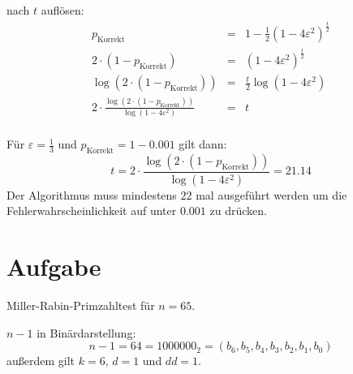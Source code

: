 \documentclass[DIN, pagenumber=false, fontsize=11pt, parskip=half]{scrartcl}
\begin{document}
    nach $t$ auflösen:
    \begin{eqnarray}
        p_\text{Korrekt} &=& 1 - \frac{1}{2} {\left(1 - 4 \varepsilon^2 \right)}^{\frac{t}{2}} \\
        2 \cdot (1 - p_\text{Korrekt}) &=& {\left(1 - 4 \varepsilon^2 \right)}^{\frac{t}{2}} \\
        \log\left(2 \cdot (1 - p_\text{Korrekt})\right) &=& \frac{t}{2} \log \left(1 - 4 \varepsilon^2 \right) \\
        2 \cdot \frac{\log\left(2 \cdot (1 - p_\text{Korrekt})\right)}{\log \left(1 - 4 \varepsilon^2 \right)} &=& t  \\
    \end{eqnarray}

    Für $\varepsilon = \frac{1}{3}$ und $p_\text{Korrekt}=1-0.001$ gilt dann:
    \begin{equation}
        t = 2 \cdot \frac{\log\left(2 \cdot (1 - p_\text{Korrekt})\right)}{\log \left(1 - 4 \varepsilon^2 \right)} = 21.14
    \end{equation}
    Der Algorithmus muss mindestens $22$ mal ausgeführt werden um die Fehlerwahrscheinlichkeit auf unter $0.001$ zu drücken.

    \section{Aufgabe}
    Miller-Rabin-Primzahltest für $n=65$.

    $n-1$ in Binärdarstellung:
    \begin{equation}
        n-1 = 64 = {1000000}_2 = (b_6, b_5, b_4, b_3, b_2, b_1, b_0)
    \end{equation}
    außerdem gilt $k=6$, $d=1$ und $dd=1$.
\end{document}
